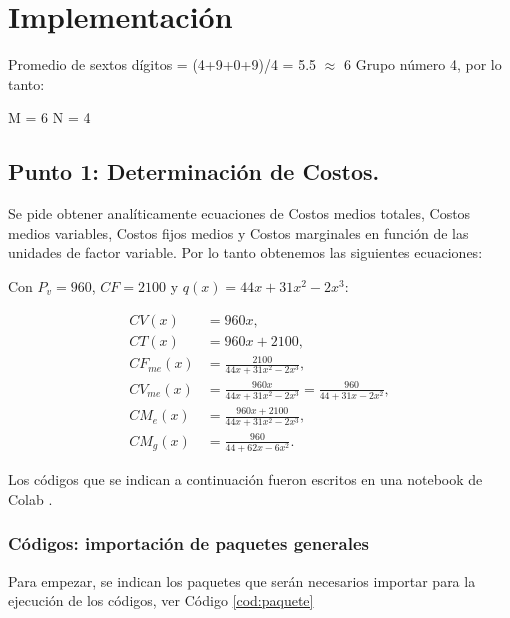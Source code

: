 
\chapter{Implementación}

Promedio de sextos dígitos = (4+9+0+9)/4 = 5.5 $\approx$ 6
Grupo número 4, por lo tanto: 

M = 6 
N = 4 





\section{Punto 1: Determinación de Costos.}

Se pide obtener analíticamente ecuaciones de Costos medios totales, Costos medios variables, Costos fijos medios y Costos marginales en función de las unidades de factor variable. Por lo tanto obtenemos las siguientes ecuaciones:

Con $P_v = 960$, $CF = 2100$ y $q(x) = 44x + 31x^2 - 2x^3$:

\begin{align}
    CV(x)      &= 960x, \\[4pt]
    CT(x)      &= 960x + 2100, \\[4pt]
    CF_{me}(x) &= \frac{2100}{44x + 31x^2 - 2x^3}, \\[4pt]
    CV_{me}(x) &= \frac{960x}{44x + 31x^2 - 2x^3}
                = \frac{960}{44 + 31x - 2x^2}, \\[4pt]
    CM_e(x)    &= \frac{960x + 2100}{44x + 31x^2 - 2x^3}, \\[4pt]
    CM_g(x)    &= \frac{960}{44 + 62x - 6x^2}.
\end{align}

Los códigos que se indican a continuación fueron escritos en una notebook de Colab \citep{Colab}.

\subsection{Códigos: importación de paquetes generales}

Para empezar, se indican los paquetes que serán necesarios importar para la ejecución de
los códigos, ver Código \ref{cod:paquete}

